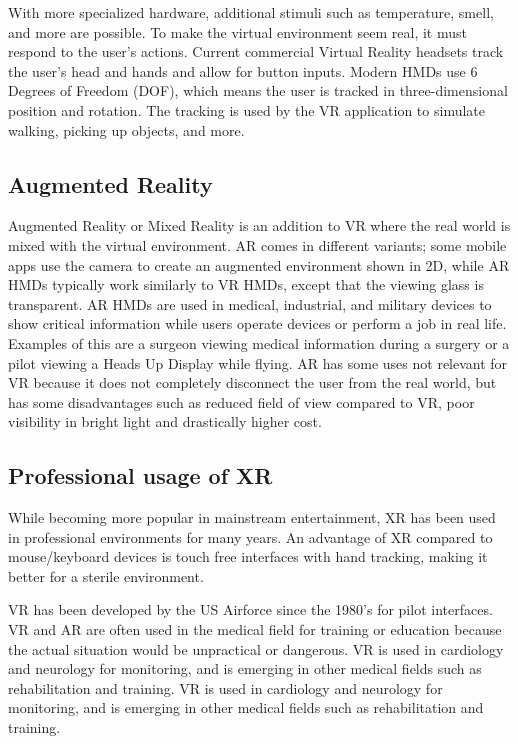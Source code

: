 \documentclass[a4paper]{report}
\begin{document}
With more specialized hardware, additional stimuli such as temperature, smell, and more are possible\cite{noauthor_feelreal_nodate}.
To make the virtual environment seem real, it must respond to the user's actions. Current commercial Virtual Reality headsets track the user's head and hands and allow for button inputs\cite{noauthor_oculus_nodate}. Modern HMDs use 6 Degrees of Freedom (DOF), which means the user is tracked in three-dimensional position and rotation\cite{lang_introduction_2013}. The tracking is used by the VR application to simulate walking, picking up objects, and more.

\subsection{ Augmented Reality }
Augmented Reality or Mixed Reality is an addition to VR where the real world is mixed with the virtual environment\cite{hackett_three-dimensional_2016}. AR comes in different variants; some mobile apps use the camera to create an augmented environment shown in 2D, while AR HMDs typically work similarly to VR HMDs, except that the viewing glass is transparent.
AR HMDs are used in medical, industrial, and military devices to show critical information while users operate devices or perform a job in real life. Examples of this are a surgeon viewing medical information during a surgery or a pilot viewing a Heads Up Display while flying\cite{mihelj_virtual_2014}\cite{mertz}.
AR has some uses not relevant for VR because it does not completely disconnect the user from the real world, but has some disadvantages such as reduced field of view compared to VR, poor visibility in bright light\cite{hackett_three-dimensional_2016} and drastically higher cost\cite{medical_holodeck_medicalholodeck_nodate}.

\subsection{Professional usage of XR}
While becoming more popular in mainstream entertainment, XR has been used in professional environments for many years.
An advantage of XR compared to mouse/keyboard devices is touch free interfaces with hand tracking, making it better for a sterile environment\cite{andrews_extended_2019}.

VR has been developed by the US Airforce since the 1980's for pilot interfaces\cite{mertz_virtual_2019}. VR and AR are often used in the medical field for training or education because the actual situation would be unpractical or dangerous\cite{freina_immersive_2015}.
VR is used in cardiology and neurology for monitoring, and is emerging in other medical fields such as rehabilitation and training\cite{mohd}.
VR is used in cardiology and neurology for monitoring, and is emerging in other medical fields such as rehabilitation and training\cite{mohd}.
\end{document}
